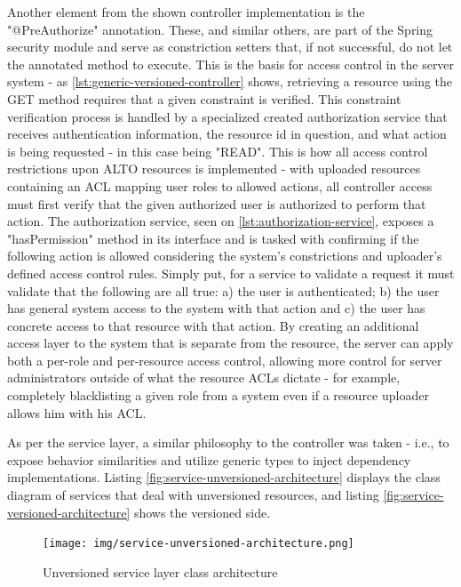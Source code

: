     Another element from the shown controller implementation is the "@PreAuthorize" annotation.
    These, and similar others, are part of the Spring security module and serve as constriction setters that, if not successful, do not let the annotated method to execute.
    This is the basis for access control in the server system - as \ref{lst:generic-versioned-controller} shows, retrieving a resource using the GET method requires that a given constraint is verified.
    This constraint verification process is handled by a specialized created authorization service that receives authentication information, the resource id in question, and what action is being requested - in this case being "READ".
    This is how all access control restrictions upon ALTO resources is implemented - with uploaded resources containing an ACL mapping user roles to allowed actions, all controller access must first verify that the given authorized user  is authorized to perform that action.
    The authorization service, seen on \ref{lst:authorization-service}, exposes a "hasPermission" method in its interface and is tasked with confirming if the following action is allowed considering the system's constrictions and uploader's defined access control rules.
    Simply put, for a service to validate a request it must validate that the following are all true: a) the user is authenticated; b) the user has general system access to the system with that action and c) the user has concrete access to that resource with that action.
    By creating an additional access layer to the system that is separate from the resource, the server can apply both a per-role and per-resource access control, allowing more control for server administrators outside of what the resource ACLs dictate - for example, completely blacklisting a given role from a system even if a resource uploader allows him with his ACL.

    As per the service layer, a similar philosophy to the controller was taken - i.e., to expose behavior similarities and utilize generic types to inject dependency implementations.
    Listing \ref{fig:service-unversioned-architecture} displays the class diagram of services that deal with unversioned resources, and listing \ref{fig:service-versioned-architecture} shows the versioned side.

\begin{figure}[ht]
\centering
\texttt{[image: img/service-unversioned-architecture.png]}
\label{fig:controller-unversioned-architecture}
\caption{Unversioned service layer class architecture}
\end{figure}

